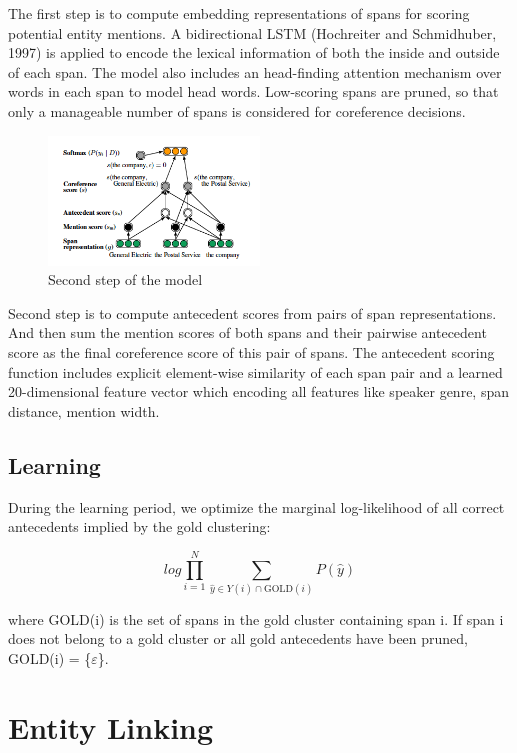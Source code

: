 \documentclass[11pt]{article}
\begin{document}
The first step is to compute embedding representations of spans for scoring potential entity mentions. A  bidirectional LSTM (Hochreiter and Schmidhuber, 1997) is applied to encode the lexical information of both the inside and outside of each span. The model also includes an head-finding attention mechanism over words in each span to model head words.
Low-scoring spans are pruned, so that only a manageable number of spans is considered for coreference decisions.

\begin{figure}[h]                
 \includegraphics[width=0.5\textwidth]{03.jpg}
 \caption{Second step of the model}             
\end{figure}

Second step is to compute antecedent scores from pairs of span representations. And then sum the mention scores of both spans and their pairwise antecedent score as the final coreference score of this pair of spans.
The antecedent scoring function includes explicit element-wise similarity of each span pair and a learned 20-dimensional feature vector which encoding all features like speaker genre, span distance, mention width.

\subsection{Learning}
During the learning period, we optimize the marginal log-likelihood of all correct antecedents implied by the gold clustering:

\begin{equation}
log\prod^{N}_{i=1}\sum_{\widehat{y}\in Y(i)\cap \text{GOLD}(i)}P(\widehat{y})
\end{equation}


where GOLD(i) is the set of spans in the gold cluster containing span i. If span i does not belong to a gold cluster or all gold antecedents have been pruned, GOLD(i) = \{$\varepsilon $\}.


\section{Entity Linking}
\end{document}
